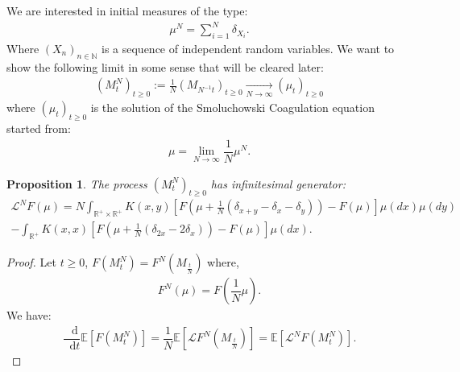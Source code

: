 \documentclass[11pt,a4paper]{article}
\newcommand{\RR}{\mathbb{R}}
\newcommand{\LC}{\mathcal{L}}
\newcommand{\E}[1]{\mathbb{E}\left[#1\right]}
\newcommand{\Proc}[1]{\left(#1\right)_{t\geq 0}}
\newcommand{\Seq}[1]{\left(#1\right)_{n\in \mathbb{N}}}
\newcommand{\dd}{\mathop{}\!\mathrm{d}}
\newtheorem{proposition}[theorem]{Proposition}
\begin{document}
We are interested in initial measures of the type:
\begin{align*}
    \mu^N = \sum\limits_{i = 1}^N \delta_{X_i}.
\end{align*}
Where $\Seq{X_n}$ is a sequence of independent random variables. We want to show the following limit in some sense that will be cleared later:
\begin{align*}
   (M^N_t)_{t\ge 0} := \frac{1}{N} \Proc{M_{N^{-1}t}} \xrightarrow[N \to \infty]{} \Proc{\mu_t} 
\end{align*}
where $\Proc{\mu_t} $ is the solution of the Smoluchowski Coagulation equation started from:
\begin{align*}
    \mu = \lim\limits_{N \to \infty} \dfrac{1}{N}\mu^N.
\end{align*}
\begin{proposition}
    The process $\Proc{M^N_{t}}$ has infinitesimal generator:
    \begin{multline*}
        \LC^N F(\mu) = N\int_{\RR^+ \times \RR^+} K(x,y)\left[ F\left(\mu + \frac{1}{N}\left(\delta_{x+y} - \delta_x - \delta_y\right) \right) - F(\mu) \right]\mu(dx)\mu(dy) \\
        -\int_{\RR^+} K(x,x)\left[ F\left(\mu + \frac{1}{N}\left(\delta_{2x} - 2\delta_x\right) \right) - F(\mu) \right]\mu(dx).
    \end{multline*}
\end{proposition}
\begin{proof}
    Let $t \geq 0$, $F(M^N_t) = F^N(M_{\frac{t}{N}})$ where,
    \begin{align*}
        F^N(\mu) = F\left(\dfrac{1}{N}\mu\right).
    \end{align*}
    We have:
    \begin{align*}
        \dfrac{\dd}{\dd t}\E{F(M^N_t)}  = \dfrac{1}{N}\E{\LC F^N\left(M_{\frac{t}{N}}\right)} =  \E{\LC^N F(M^N_t)}.
    \end{align*}
\end{proof}
\end{document}
